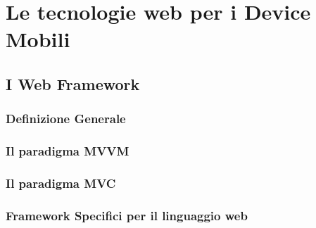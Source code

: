 \chapter{Le tecnologie web per i Device Mobili}

\section{I Web Framework}
\subsection{Definizione Generale}
\subsection{Il paradigma MVVM}
\subsection{Il paradigma MVC}
\subsection{Framework Specifici per il linguaggio web}